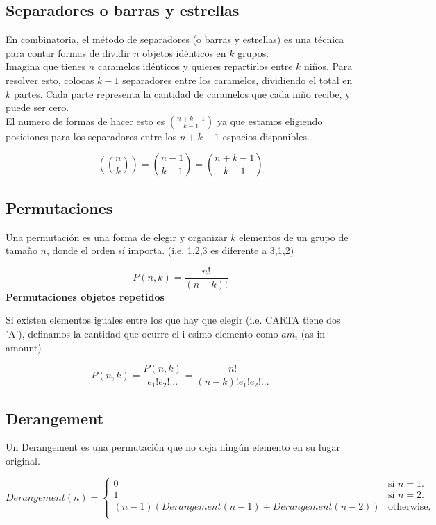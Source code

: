 \subsection{Separadores o barras y estrellas}
\begin{justify}
En combinatoria, el método de separadores (o barras y estrellas) es una técnica para contar formas de dividir $n$ objetos idénticos en $k$ grupos.
\\
Imagina que tienes $n$ caramelos idénticos y quieres repartirlos entre $k$ niños. Para resolver esto, colocas $k-1$ separadores entre los caramelos, dividiendo el total en $k$ partes. Cada parte representa la cantidad de caramelos que cada niño recibe, y puede ser cero.
\\
El numero de formas de hacer esto es $\binom{n+k-1}{k-1}$ ya que estamos eligiendo posiciones para los separadores entre los $n+k-1$ espacios disponibles.
\end{justify}
\begin{equation*}
    \left(\binom{n}{k}\right) = \binom{n-1}{k-1} = \binom{n+k-1}{k-1}
\end{equation*}


\subsection{Permutaciones}
\begin{justify}
Una permutación es una forma de elegir y organizar $k$ elementos de un grupo de tamaño $n$, donde el orden sí importa. (i.e. 1,2,3 es diferente a 3,1,2)
\end{justify}
\begin{equation*}
    P(n,k) = \frac{n!}{(n-k)!}
\end{equation*}
\textbf{Permutaciones objetos repetidos}
\begin{justify}
Si existen elementos iguales entre los que hay que elegir (i.e. CARTA tiene dos 'A'), definamos la cantidad que ocurre el i-esimo elemento como $am_{i}$ (as in amount)-
\end{justify}
\begin{equation*}
    P(n,k) = \frac{P(n,k)}{e_{1}!e_{2}!...} = \frac{n!}{(n-k)!e_{1}!e_{2}!...}
\end{equation*}
\subsection{Derangement} 
\begin{justify}
Un Derangement es una permutación que no deja ningún elemento en su lugar original.
\end{justify}
      \begin{equation*}
        Derangement(n)=
        \begin{cases}
			0 & \text{si $n = 1$}.\\
			1 & \text{si $n = 2$}.\\
			(n - 1)( Derangement(n - 1) + Derangement(n - 2) ) & \text{otherwise}.\\
		\end{cases}
      \end{equation*}

